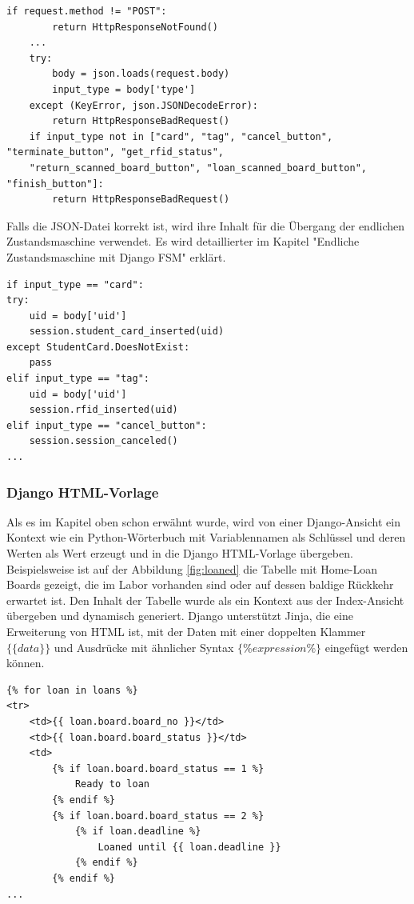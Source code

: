 \begin{lstlisting}[caption={Events-Ansicht in Django, JSON-Parsing},captionpos=b]
    if request.method != "POST":
		return HttpResponseNotFound()
	...
	try:
		body = json.loads(request.body)
		input_type = body['type']
	except (KeyError, json.JSONDecodeError):
		return HttpResponseBadRequest()	
	if input_type not in ["card", "tag", "cancel_button", "terminate_button", "get_rfid_status",
	"return_scanned_board_button", "loan_scanned_board_button", "finish_button"]:
		return HttpResponseBadRequest()
\end{lstlisting}
Falls die JSON-Datei korrekt ist, wird ihre Inhalt für die Übergang der endlichen Zustandsmaschine verwendet. Es wird detaillierter im Kapitel "Endliche Zustandsmaschine mit Django FSM" erklärt.
\begin{lstlisting}[caption={Events-Ansicht in Django, Aufur von FSM Transitions},captionpos=b]
if input_type == "card":
try:
	uid = body['uid']
	session.student_card_inserted(uid)
except StudentCard.DoesNotExist:
	pass
elif input_type == "tag":
	uid = body['uid']
	session.rfid_inserted(uid)
elif input_type == "cancel_button":
	session.session_canceled()
...
\end{lstlisting}

\subsubsection{Django HTML-Vorlage}
\label{sec:server:design:templates}
Als es im Kapitel oben schon erwähnt wurde, wird von einer Django-Ansicht ein Kontext wie ein Python-Wörterbuch mit Variablennamen als Schlüssel und deren Werten als Wert erzeugt und in die Django HTML-Vorlage übergeben. Beispielsweise ist auf der Abbildung \ref{fig:loaned} die Tabelle mit Home-Loan Boards gezeigt, die im Labor vorhanden sind oder auf dessen baldige Rückkehr erwartet ist. Den Inhalt der Tabelle wurde als ein Kontext aus der Index-Ansicht übergeben und dynamisch generiert. Django unterstützt Jinja, die eine Erweiterung von HTML ist, mit der Daten mit einer doppelten Klammer $\{\{data\}\}$ und Ausdrücke mit ähnlicher Syntax $\{\% expression\%\}$ eingefügt werden können.

\begin{lstlisting}[caption={Django Template Sprache in index.html},captionpos=b]
{% for loan in loans %}
<tr>
	<td>{{ loan.board.board_no }}</td>
	<td>{{ loan.board.board_status }}</td>
	<td>
		{% if loan.board.board_status == 1 %}
			Ready to loan
		{% endif %}
		{% if loan.board.board_status == 2 %}
			{% if loan.deadline %}
				Loaned until {{ loan.deadline }}
			{% endif %}
		{% endif %}
...
\end{lstlisting}

